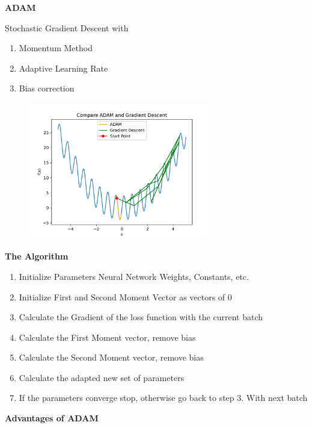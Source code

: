 \documentclass{beamer}
\newcommand\myheading[1]{%
  \par\bigskip
  {\Large\bfseries#1}\par\smallskip}
\begin{document}
\begin{frame}
    \myheading{ADAM}
    Stochastic Gradient Descent with
    \begin{enumerate}
        \item Momentum Method
        \item Adaptive Learning Rate
        \item Bias correction
    \end{enumerate}
    
    \begin{figure}[h]
        \includegraphics[width=8cm]{report/figures/adam_vs_gradientdescent.pdf}
    \end{figure}
\end{frame}

\begin{frame}
    \myheading{The Algorithm}
    \begin{enumerate}
        \item Initialize Parameters
        Neural Network Weights, Constants, etc.
        \item Initialize First and Second Moment Vector as vectors of 0
        \item Calculate the Gradient of the loss function with the current batch
        \item Calculate the First Moment vector, remove bias
        \item Calculate the Second Moment vector, remove bias
        \item Calculate the adapted new set of parameters
        \item If the parameters converge stop, otherwise go back to step 3. With next batch
    \end{enumerate}
\end{frame}




\begin{frame}
    \myheading{Advantages of ADAM}
\end{frame}
\end{document}
